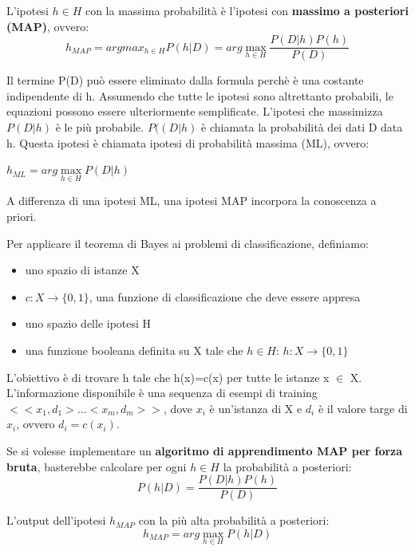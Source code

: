 \documentclass[a4paper]{extarticle}
\begin{document}
L'ipotesi $h\in H$ con la massima probabilità è l'ipotesi con \textbf{massimo a posteriori (MAP)}, ovvero:
\begin{equation*}
h_{MAP} = arg  max_{h \in H} P (h|D) = arg  \underset{h \in H}{\max} \dfrac{P(D|h)P(h)}{P(D)}
\end{equation*} 

Il termine P(D) può essere eliminato dalla formula perchè è una costante indipendente di h. Assumendo che tutte le ipotesi sono altrettanto probabili, le equazioni possono essere ulteriormente semplificate. L'ipotesi che massimizza $P(D|h)$ è le più probabile. $P((D|h)$ è chiamata la probabilità dei dati D data h. Questa ipotesi è chiamata ipotesi di probabilità massima (ML), ovvero:
\begin{center}
$h_{ML} = arg \underset{h \in H}{\max} P(D|h)$
\end{center} 

A differenza di una ipotesi ML, una ipotesi MAP incorpora la conoscenza a priori.

Per applicare il teorema di Bayes ai problemi di classificazione, definiamo:
\begin{itemize}
\item uno spazio di istanze X
\item $c: X \rightarrow \{0,1\}$, una funzione di classificazione che deve essere appresa
\item uno spazio delle ipotesi H
\item una funzione booleana definita su X tale che $h \in H$: $h : X \rightarrow \{0,1\}$
\end{itemize}

L'obiettivo è di trovare h tale che h(x)=c(x) per tutte le istanze x $\in$ X. L'informazione disponibile è una sequenza di esempi di training $<<x_1,d_1>\dots <x_m,d_m>>$, dove $x_i$ è un'istanza di X e $d_i$ è il valore targe di $x_i$, ovvero $d_i = c(x_i)$.

Se si volesse implementare un \textbf{algoritmo di apprendimento MAP per forza bruta}, basterebbe calcolare per ogni $h \in H$ la probabilità a posteriori:
\begin{equation*}
P(h|D) = \dfrac{P(D|h)P(h)}{P(D)}
\end{equation*} 

L'output dell'ipotesi $h_{MAP}$ con la più alta probabilità a posteriori:
\begin{equation*}
h_{MAP} = arg  \underset{h \in H}{\max} P(h|D)
\end{equation*}
\end{document}
